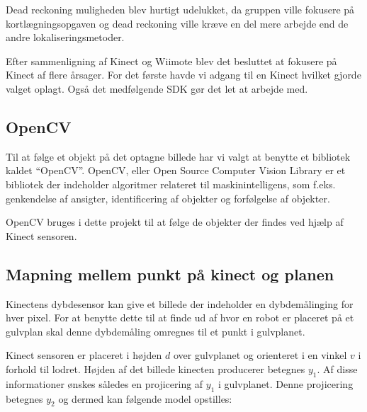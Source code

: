 Dead reckoning muligheden blev hurtigt udelukket, da gruppen ville fokusere på kortlægningsopgaven og dead reckoning ville kræve en del mere arbejde end de andre lokaliseringsmetoder.

Efter sammenligning af Kinect og Wiimote blev det besluttet at fokusere på Kinect af flere årsager.
For det første havde vi adgang til en Kinect hvilket gjorde valget oplagt. 
Også det medfølgende SDK gør det let at arbejde med.

\subsection{OpenCV}
Til at følge et objekt på det optagne billede har vi valgt at benytte et bibliotek kaldet ``OpenCV''.
OpenCV, eller Open Source Computer Vision Library er et bibliotek der indeholder algoritmer relateret til maskinintelligens, som f.eks. genkendelse af ansigter, identificering af objekter og forfølgelse af objekter.\cite{opencv}

OpenCV bruges i dette projekt til at følge de objekter der findes ved hjælp af Kinect sensoren.

\clearpage
\subsection{Mapning mellem punkt på kinect og planen}

Kinectens dybdesensor kan give et billede der indeholder en dybdemålinging for hver pixel. 
For at benytte dette til at finde ud af hvor en robot er placeret på et gulvplan skal denne dybdemåling omregnes til et punkt i gulvplanet.

Kinect sensoren er placeret i højden $ d $ over gulvplanet og orienteret i en vinkel $v$ i forhold til lodret.
Højden af det billede kinecten producerer betegnes $y_1$.
Af disse informationer ønskes således en projicering af $y_1$ i gulvplanet.
Denne projicering betegnes $y_2$ og dermed kan følgende model opstilles:

\begin{center}
\end{center}

